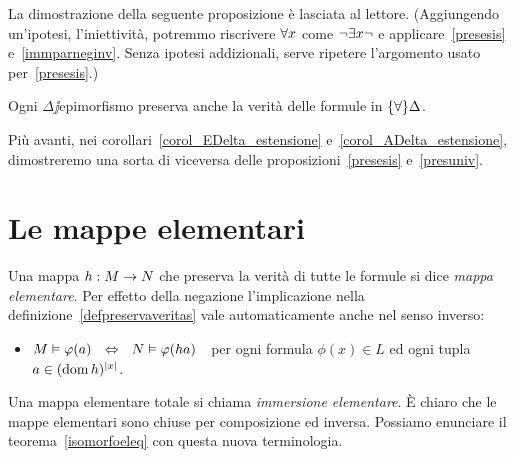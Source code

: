 La dimostrazione della seguente proposizione \`e lasciata al lettore. (Aggiungendo un'ipotesi, l'iniettivit\`a, potremmo riscrivere $\forall x$ come $\neg\exists x\neg$ e applicare~\ref{presesis} e~\ref{immparneginv}. Senza ipotesi addizionali, serve ripetere l'argomento usato per~\ref{presesis}.)

\begin{proposition}\label{presuniv}
Ogni $\Delta\jj$epimorfismo preserva anche la verit\`a delle formule in $\{\forall\}\Delta$.\QED
\end{proposition}

Pi\`u avanti, nei corollari~\ref{corol_EDelta_estensione} e~\ref{corol_ADelta_estensione}, dimostreremo una sorta di viceversa  delle proposizioni~\ref{presesis} e~\ref{presuniv}.



\section{Le mappe elementari}\label{mappeelementari}
Una mappa $h:M\rightarrow N$ che preserva la verit\`a di tutte le formule si dice \emph{mappa elementare}. Per effetto della negazione l'implicazione nella definizione~\ref{defpreservaveritas} vale automaticamente anche nel senso inverso:
\begin{itemize}
\item[] $M\models\phi(a)\ \ \IFF\ \ N\models\phi(ha)$\ \  per ogni formula $\phi(x)\in L$ ed ogni tupla $a\in(\mathop{\rm dom} h)^{|x|}$.
\end{itemize}

Una mappa elementare totale si chiama \emph{immersione elementare}. \`E chiaro che le mappe elementari sono chiuse per composizione ed inversa. Possiamo enunciare il teorema~\ref{isomorfoeleq} con questa nuova terminologia.

